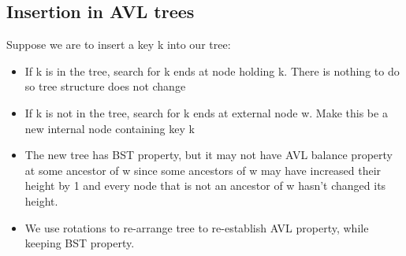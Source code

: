 \documentclass[12pt]{article}
\newcommand{\1}{\space \quad}
\newcommand{\2}{\quad \quad \quad}
\newcommand{\3}{\quad \quad \quad \quad \space}
\newcommand{\4}{\quad \quad \quad \quad \quad \quad}
\begin{document}
\subsection{Insertion in AVL trees}
Suppose we are to insert a key k into our tree:
\begin{itemize}
  \item If k is in the tree, search for k ends at node holding k. There is nothing to do so tree structure does not change
  \item If k is not in the tree, search for k ends at external node w. Make this be a new internal node containing key k
  \item The new tree has BST property, but it may not have AVL balance property at some ancestor of w since some ancestors 
  of w may have increased their height by 1 and every node that is not an ancestor of w hasn’t changed its height.
  \item We use rotations to re-arrange tree to re-establish AVL property, while keeping BST property.


\end{itemize}
\end{document}
